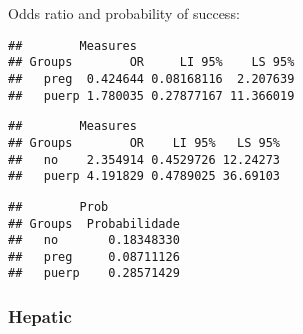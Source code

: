 \documentclass[
]{article}
\newenvironment{Shaded}{\begin{snugshade}}{\end{snugshade}}
\newcommand{\CommentTok}[1]{\textcolor[rgb]{0.56,0.35,0.01}{\textit{#1}}}
\newcommand{\KeywordTok}[1]{\textcolor[rgb]{0.13,0.29,0.53}{\textbf{#1}}}
\newcommand{\NormalTok}[1]{#1}
\newcommand{\OperatorTok}[1]{\textcolor[rgb]{0.81,0.36,0.00}{\textbf{#1}}}
\newcommand{\StringTok}[1]{\textcolor[rgb]{0.31,0.60,0.02}{#1}}
\begin{document}
Odds ratio and probability of success:

\begin{Shaded}
\end{Shaded}

\begin{verbatim}
##        Measures
## Groups        OR     LI 95%    LS 95%
##   preg  0.424644 0.08168116  2.207639
##   puerp 1.780035 0.27877167 11.366019
\end{verbatim}

\begin{Shaded}
\end{Shaded}

\begin{verbatim}
##        Measures
## Groups        OR    LI 95%   LS 95%
##   no    2.354914 0.4529726 12.24273
##   puerp 4.191829 0.4789025 36.69103
\end{verbatim}

\begin{Shaded}
\end{Shaded}

\begin{verbatim}
##        Prob
## Groups  Probabilidade
##   no       0.18348330
##   preg     0.08711126
##   puerp    0.28571429
\end{verbatim}

\hypertarget{hepatic-1}{%
\subsubsection{Hepatic}\label{hepatic-1}}

\begin{Shaded}
\end{Shaded}
\end{document}
